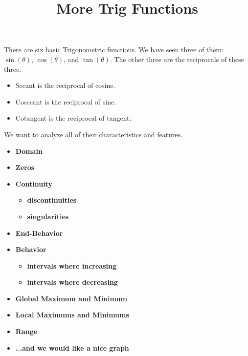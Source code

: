 \documentclass{ximera}
\title{More Trig Functions}
\begin{document}
\begin{abstract}
%
\end{abstract}
\maketitle



There are six basic Trigonometric functions.  We have seen three of them: $\sin(\theta)$, $\cos(\theta)$, and $\tan(\theta)$. The other three are the reciprocals of these three.


\begin{itemize}
\item Secant is the reciprocal of cosine.
\item Cosecant is the reciprocal of sine.
\item Cotangent is the reciprocal of tangent.
\end{itemize}


We want to analyze all of their characteristics and features. 




\begin{itemize}
\item \textbf{\textcolor{red!80!black}{Domain}} 
\item \textbf{\textcolor{red!80!black}{Zeros}} 
\item \textbf{\textcolor{red!80!black}{Continuity}} 
  \begin{itemize}
     \item \textbf{\textcolor{purple!85!blue}{discontinuities}} 
     \item \textbf{\textcolor{purple!85!blue}{singularities}} 
  \end{itemize}
\item \textbf{\textcolor{red!80!black}{End-Behavior}} 
\item \textbf{\textcolor{red!80!black}{Behavior}} 
  \begin{itemize}
     \item \textbf{\textcolor{purple!85!blue}{intervals where increasing}} 
     \item \textbf{\textcolor{purple!85!blue}{intervals where decreasing}} 
  \end{itemize}
\item \textbf{\textcolor{red!80!black}{Global Maximum and Minimum}} 
\item \textbf{\textcolor{red!80!black}{Local Maximums and Minimums}} 
\item \textbf{\textcolor{red!80!black}{Range}} 
\item \textbf{\textcolor{blue!55!black}{...and we would like a nice graph}} 
\end{itemize}
\end{document}
